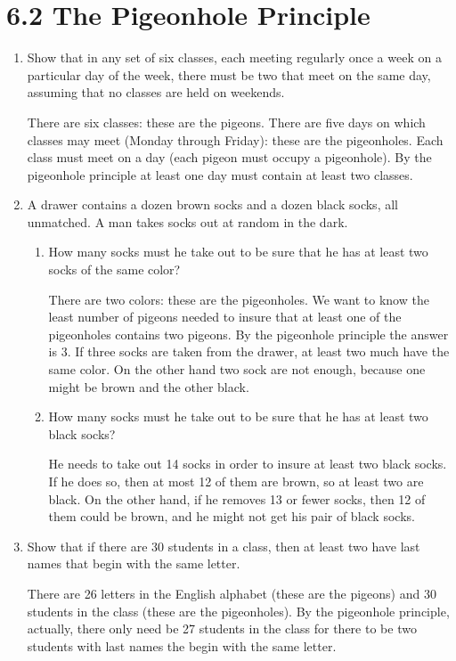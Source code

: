 \documentclass[11pt]{article}
\begin{document}
\section*{\textbf{6.2 The Pigeonhole Principle}}
\begin{enumerate}[label=\textbf{\arabic*.}]
	\item Show that in any set of six classes, each meeting regularly once a week on a particular day of the week, there must be two that meet on the same day, assuming that no classes are held on weekends.
	
	There are six classes: these are the pigeons. There are five days on which classes may meet (Monday through Friday): these are the pigeonholes. Each class must meet on a day (each pigeon must occupy a pigeonhole). By the pigeonhole principle at least one day must contain at least two classes.
	
	\item A drawer contains a dozen brown socks and a dozen black socks, all unmatched. A man takes socks out at random in the dark.
	
	\begin{enumerate}[label=\textbf{\alph*)}]
		\item How many socks must he take out to be sure that he has at least two socks of the same color?
		
		There are two colors: these are the pigeonholes. We want to know the least number of pigeons needed to insure that at least one of the pigeonholes contains two pigeons. By the pigeonhole principle the answer is 3. If three socks are taken from the drawer, at least two much have the same color. On the other hand two sock are not enough, because one might be brown and the other black.
		
		\item How many socks must he take out to be sure that he has at least two black socks?
		
		He needs to take out 14 socks in order to insure at least two black socks. If he does so, then at most 12 of them are brown, so at least two are black. On the other hand, if he removes 13 or fewer socks, then 12 of them could be brown, and he might not get his pair of black socks.
	\end{enumerate}

	\item Show that if there are 30 students in a class, then at least two have last names that begin with the same letter.
	
	There are 26 letters in the English alphabet (these are the pigeons) and 30 students in the class (these are the pigeonholes). By the pigeonhole principle, actually, there only need be 27 students in the class for there to be two students with last names the begin with the same letter.
	

\end{enumerate}
\end{document}

